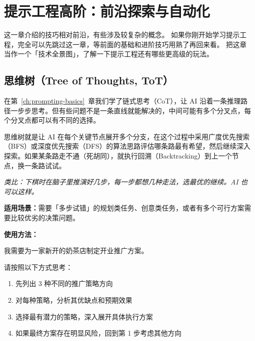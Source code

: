 % 
% 


\chapter{提示工程高阶：前沿探索与自动化}
\label{ch:prompting-advanced}

这一章介绍的技巧相对前沿，有些涉及较复杂的概念。
如果你刚开始学习提示工程，完全可以先跳过这一章，等前面的基础和进阶技巧用熟了再回来看。
把这章当作一个「技术全景图」，了解一下提示工程还有哪些更高级的玩法。

\section{思维树（Tree of Thoughts, ToT）}

在第~\ref{ch:prompting-basics}~章我们学了链式思考（CoT），让 AI 沿着一条推理路径一步步思考。但有些问题不是一条直线就能解决的，中间可能有多个分叉点，每个分叉点都可以有不同的选择。

思维树就是让 AI 在每个关键节点展开多个分支，在这个过程中采用广度优先搜索（BFS）或深度优先搜索（DFS）的算法思路评估哪条路最有希望，然后继续深入探索。如果某条路走不通（死胡同），就执行回溯（Backtracking）到上一个节点，换一条路试试。

\textit{类比：下棋时在脑子里推演好几步，每一步都想几种走法，选最优的继续。AI 也可以这样。}

\textbf{适用场景：}需要「多步试错」的规划类任务、创意类任务，或者有多个可行方案需要比较优劣的决策问题。

\textbf{使用方法：}

\begin{promptbox}
我需要为一家新开的奶茶店制定开业推广方案。

请按照以下方式思考：
\begin{enumerate}
  \item 先列出 3 种不同的推广策略方向
  \item 对每种策略，分析其优缺点和预期效果
  \item 选择最有潜力的策略，深入展开具体执行方案
  \item 如果最终方案存在明显风险，回到第 1 步考虑其他方向
\end{enumerate}
\end{promptbox}

